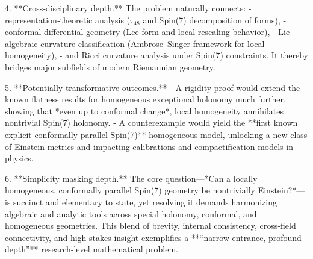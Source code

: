 4. **Cross‑disciplinary depth.**  
   The problem naturally connects:
   - representation‑theoretic analysis (\(\tau_{48}\) and Spin(7) decomposition of forms),
   - conformal differential geometry (Lee form and local rescaling behavior),
   - Lie algebraic curvature classification (Ambrose–Singer framework for local homogeneity),
   - and Ricci curvature analysis under Spin(7) constraints.  
   It thereby bridges major subfields of modern Riemannian geometry.

5. **Potentially transformative outcomes.**  
   - A rigidity proof would extend the known flatness results for homogeneous exceptional holonomy much further, showing that *even up to conformal change*, local homogeneity annihilates nontrivial Spin(7) holonomy.  
   - A counterexample would yield the **first known explicit conformally parallel Spin(7)** homogeneous model, unlocking a new class of Einstein metrics and impacting calibrations and compactification models in physics.

6. **Simplicity masking depth.**  
   The core question—*Can a locally homogeneous, conformally parallel Spin(7) geometry be nontrivially Einstein?*—is succinct and elementary to state, yet resolving it demands harmonizing algebraic and analytic tools across special holonomy, conformal, and homogeneous geometries.  
   This blend of brevity, internal consistency, cross‑field connectivity, and high‑stakes insight exemplifies a **“narrow entrance, profound depth”** research‑level mathematical problem.